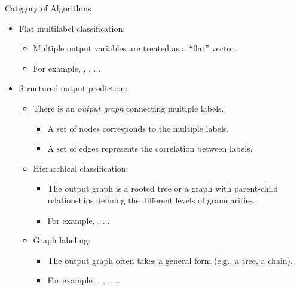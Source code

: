 \documentclass[first=dgreen,second=purple,logo=yellowexc]{aaltoslides}
\begin{document}
%
\begin{frame}{Category of Algorithms}
	\begin{itemize}
		\item Flat multilabel classification:
		\begin{itemize}
			\item Multiple output variables are treated as a ``flat'' vector.
			\item For example, \mlknn, \adaboostmh, ...
		\end{itemize}
		\item Structured output prediction:
		\begin{itemize}
			\item There is an \textit{output graph} connecting multiple labels.
			\begin{itemize}
				\item A set of nodes corresponds to the multiple labels.
				\item A set of edges represents the correlation between labels.
			\end{itemize}
			\item Hierarchical classification:
			\begin{itemize}
				\item The output graph is a rooted tree or a graph with parent-child relationships defining the different levels of granularities.
				\item For example, \svmstruct, ...
			\end{itemize}
			\item Graph labeling:
			\begin{itemize}
				\item The output graph often takes a general form (e.g., a tree, a chain).
				\item For example, \mmmn, \crf, \mmcrf, ...
			\end{itemize}
		\end{itemize}
	\end{itemize}
\end{frame}



%
\begin{frame}{}
\end{frame}


\iffalse
\begin{frame}[allowframebreaks]{Bibliography}
	
	
\end{frame}
\fi
\end{document}
